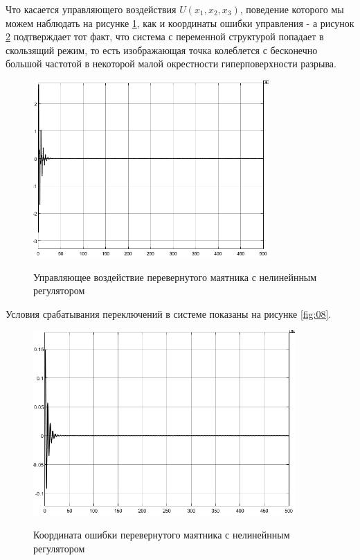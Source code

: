 Что касается управляющего воздействия $U(x_1,x_2,x_3)$, поведение которого мы можем наблюдать на рисунке \ref{fig:06}, как и координаты ошибки управления - а рисунок \ref{fig:07} подтверждает тот факт, что система с переменной структурой попадает в скользящий режим, то есть изображающая точка колеблется с бесконечно большой частотой в некоторой малой окрестности гиперповерхности разрыва. 

\begin{figure}[h!]
\begin{center}
\includegraphics[angle=0,width=9cm]{fig/06.png}\\[2mm]
\caption{Управляющее воздействие перевернутого маятника с нелинейнным регулятором}\label{fig:06}
\end{center}
\end{figure}
Условия срабатывания переключений в системе показаны на рисунке \ref{fig:08}.
\begin{figure}[h!]
\begin{center}
\includegraphics[angle=0,width=10cm]{fig/07.png}\\[2mm]
\caption{Координата ошибки перевернутого маятника с нелинейнным регулятором}\label{fig:07}
\end{center}
\end{figure}

